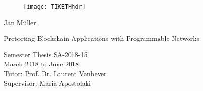   \begin{titlepage}

  \begin{center}
  \begin{figure}[!t]
     \texttt{[image: TIKETHhdr]}
  \end{figure}
  \end{center}

  \vspace{2 cm}

  {\large Jan Müller}
  \vspace{2 cm}

  {\Huge Protecting Blockchain Applications with Programmable Networks}\\

  \vspace{\fill}


  Semester Thesis SA-2018-15\\
  March 2018 to June 2018\\

  \vspace{1cm}
  Tutor: Prof. Dr. Laurent Vanbever\\
  Supervisor: Maria Apostolaki \\
    
  \end{titlepage}
